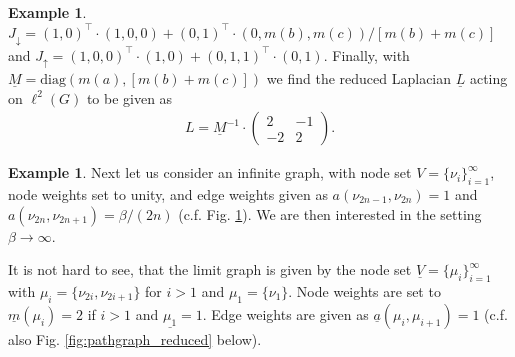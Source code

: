 \documentclass[reqno,12pt,letterpaper]{amsart}
\numberwithin{equation}{section}
\newcommand{\1}{\mathds{1}}
\theoremstyle{definition}
\newtheorem{Ex}[Th]{Example}
\begin{document}
\begin{Ex}
\noindent  
$J_\downarrow = (1,0)^\intercal\cdot (1,0,0) + (0,1)^\intercal \cdot (0,m(b), m(c))/[m(b) + m(c)]$ and
$J_\uparrow = (1,0,0)^\intercal \cdot (1,0) + (0,1,1)^\intercal \cdot (0,1) $. Finally, with $\underline{M}  = \text{diag}(m(a) , [m(b) + m(c)])$ we find the reduced Laplacian $\underline{L}$ acting  on $\ell^2(G)$ to be given as
\begin{align}
L = \underline{M}^{-1} \cdot	\begin{pmatrix}
		2 & -1 \\
		-2 & 2
	\end{pmatrix}.
\end{align}
	\end{Ex}
	
	
	
	
	\begin{Ex}\label{zero_is_accumulation_point} Next let us consider an infinite graph, with node set $V = \{\nu_i\}_{i = 1}^\infty$, node weights set to unity, and edge weights given as $a(\nu_{2n-1},\nu_{2n}) =1$ and $a(\nu_{2n},\nu_{2n+1}) =\beta/(2n)$ (c.f. Fig. \ref{fig:pathgraph}). We are then interested in the setting $\beta \rightarrow \infty$.
\begin{figure}[H]
\label{fig:pathgraph}
\end{figure}
 \noindent It is not hard to see, that the limit graph is given by the node set $\underline{V} = \{\mu_i\}_{i = 1}^\infty$ with $\mu_i = \{\nu_{2i },\nu_{2i +1 }\}$ for $i > 1$ and $\mu_1 = \{\nu_1\}$. Node weights are set to $\underline{m}(\mu_i) = 2$ if $i > 1$  and $\underline{\mu_1} = 1$. Edge weights are given as $\underline{a}(\mu_i, 
 \mu_{i + 1}) = 1$ (c.f. also Fig. \ref{fig:pathgraph_reduced} below). 
  \begin{figure}[H]
\end{figure}
\end{Ex}
\end{document}
